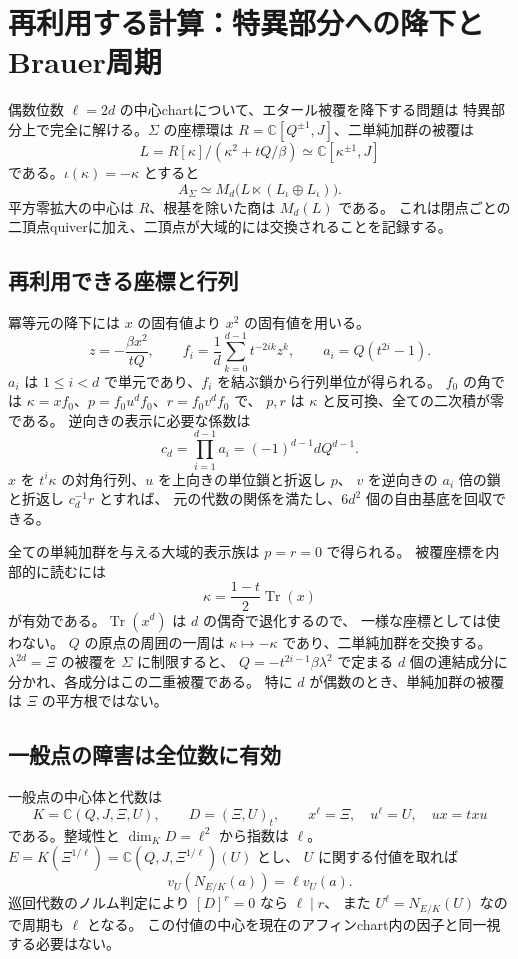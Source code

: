 \section{再利用する計算：特異部分への降下とBrauer周期}
\label{sec:descent-notes-v39}

偶数位数 $\ell=2d$ の中心chartについて、エタール被覆を降下する問題は
特異部分上で完全に解ける。$\Sigma$ の座標環は
$R=\mathbb C[Q^{\pm1},J]$、二単純加群の被覆は
\[
 L=R[\kappa]/(\kappa^2+tQ/\beta)
 \simeq\mathbb C[\kappa^{\pm1},J]
\]
である。$\iota(\kappa)=-\kappa$ とすると
\[
 A_\Sigma\simeq M_d\bigl(L\ltimes(L_\iota\oplus L_\iota)\bigr).
\]
平方零拡大の中心は $R$、根基を除いた商は $M_d(L)$ である。
これは閉点ごとの二頂点quiverに加え、二頂点が大域的には交換されることを記録する。

\subsection*{再利用できる座標と行列}

冪等元の降下には $x$ の固有値より $x^2$ の固有値を用いる。
\[
 z=-\frac{\beta x^2}{tQ},\qquad
 f_i=\frac1d\sum_{k=0}^{d-1}t^{-2ik}z^k,
 \qquad a_i=Q(t^{2i}-1).
\]
$a_i$ は $1\le i<d$ で単元であり、$f_i$ を結ぶ鎖から行列単位が得られる。
$f_0$ の角では $\kappa=xf_0$、$p=f_0u^df_0$、$r=f_0v^df_0$ で、
$p,r$ は $\kappa$ と反可換、全ての二次積が零である。
逆向きの表示に必要な係数は
\[
 c_d=\prod_{i=1}^{d-1}a_i=(-1)^{d-1}dQ^{d-1}.
\]
$x$ を $t^i\kappa$ の対角行列、$u$ を上向きの単位鎖と折返し $p$、
$v$ を逆向きの $a_i$ 倍の鎖と折返し $c_d^{-1}r$ とすれば、
元の代数の関係を満たし、$6d^2$ 個の自由基底を回収できる。

全ての単純加群を与える大域的表示族は $p=r=0$ で得られる。
被覆座標を内部的に読むには
\[
 \kappa=\frac{1-t}{2}\operatorname{Tr}(x)
\]
が有効である。$\operatorname{Tr}(x^d)$ は $d$ の偶奇で退化するので、
一様な座標としては使わない。
$Q$ の原点の周囲の一周は $\kappa\mapsto-\kappa$ であり、二単純加群を交換する。
$\lambda^{2d}=\Xi$ の被覆を $\Sigma$ に制限すると、
$Q=-t^{2i-1}\beta\lambda^2$ で定まる $d$ 個の連結成分に分かれ、各成分はこの二重被覆である。
特に $d$ が偶数のとき、単純加群の被覆は $\Xi$ の平方根ではない。

\subsection*{一般点の障害は全位数に有効}

一般点の中心体と代数は
\[
 K=\mathbb C(Q,J,\Xi,U),\qquad
 D=(\Xi,U)_t,\qquad
 x^\ell=\Xi,\quad u^\ell=U,\quad ux=txu
\]
である。整域性と $\dim_KD=\ell^2$ から指数は $\ell$。
$E=K(\Xi^{1/\ell})=\mathbb C(Q,J,\Xi^{1/\ell})(U)$ とし、
$U$ に関する付値を取れば
\[
 v_U(N_{E/K}(a))=\ell v_U(a).
\]
巡回代数のノルム判定により $[D]^r=0$ なら $\ell\mid r$、
また $U^\ell=N_{E/K}(U)$ なので周期も $\ell$ となる。
この付値の中心を現在のアフィンchart内の因子と同一視する必要はない。

